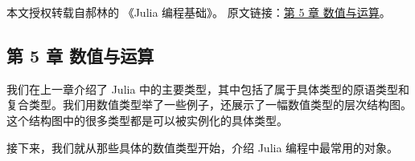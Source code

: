 
本文授权转载自郝林的 《Julia 编程基础》。 原文链接：\href{https://github.com/hyper0x/JuliaBasics/blob/master/book/ch05.md}{第 5 章 数值与运算}。


\subsection{第 5 章 数值与运算}

我们在上一章介绍了 Julia 中的主要类型，其中包括了属于具体类型的原语类型和复合类型。我们用数值类型举了一些例子，还展示了一幅数值类型的层次结构图。这个结构图中的很多类型都是可以被实例化的具体类型。

接下来，我们就从那些具体的数值类型开始，介绍 Julia 编程中最常用的对象。